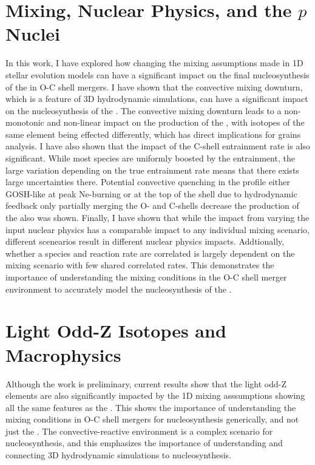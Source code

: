 \label{concl}

\section{Mixing, Nuclear Physics, and the \texorpdfstring{$p$}{p} Nuclei}\label{sec:mixing_nuclear_pnuclei
}

In this work, I have explored how changing the mixing assumptions made in 1D stellar evolution models can have a significant impact on the final nucleosynthesis of the \pnucn{} in O-C shell mergers.
I have shown that the convective mixing downturn, which is a feature of 3D hydrodynamic simulations, can have a significant impact on the nucleosynthesis of the \pnucn{}.
The convective mixing downturn leads to a non-monotonic and non-linear impact on the production of the \pnucn{}, with isotopes of the same element being effected differently, which has direct implications for grains analysis.
I have also shown that the impact of the C-shell entrainment rate is also significant.
While most species are uniformly boosted by the entrainment, the large variation depending on the true entrainment rate means that there exists large uncertainties there.
Potential convective quenching in the profile either GOSH-like at peak Ne-burning or at the top of the shell due to hydrodynamic feedback only partially merging the O- and C-shells decrease the production of the \pnucn{} also was shown.
Finally, I have shown that while the impact from varying the input nuclear physics has a comparable impact to any individual mixing scenario, different scenearios result in different nuclear physics impacts.
Addtionally, whether a species and reaction rate are correlated is largely dependent on the mixing scenario with few shared correlated rates.
This demonstrates the importance of understanding the mixing conditions in the O-C shell merger environment to accurately model the nucleosynthesis of the \pnucn{}.

\section{Light Odd-Z Isotopes and Macrophysics}\label{sec:lightoddZ_summary}

Although the work is preliminary, current results show that the light odd-Z elements are also significantly impacted by the 1D mixing asssumptions showing all the same features as the \pnucn{}.
This shows the importance of understanding the mixing conditions in O-C shell mergers for nucleosynthesis generically, and not just the \pnucn{}.
The convective-reactive environment is a complex scenario for nucleosynthesis, and this emphasizes the importance of understanding and connecting 3D hydrodynamic simulations to nucleosynthesis.

